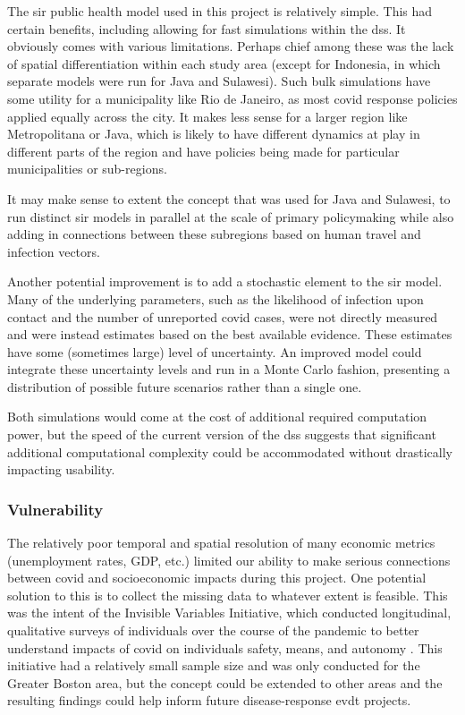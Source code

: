 The \ac{sir} public health model used in this project is relatively simple. This had certain benefits, including allowing for fast simulations within the \ac{dss}. It obviously comes with various limitations. Perhaps chief among these was the lack of spatial differentiation within each study area (except for Indonesia, in which separate models were run for Java and Sulawesi). Such bulk simulations have some utility for a municipality like Rio de Janeiro, as most \ac{covid} response policies applied equally across the city. It makes less sense for a larger region like Metropolitana or Java, which is likely to have different dynamics at play in different parts of the region and have policies being made for particular municipalities or sub-regions.

It may make sense to extent the concept that was used for Java and Sulawesi, to run distinct \ac{sir} models in parallel at the scale of primary policymaking while also adding in connections between these subregions based on human travel and infection vectors.

Another potential improvement is to add a stochastic element to the \ac{sir} model. Many of the underlying parameters, such as the likelihood of infection upon contact and the number of unreported \ac{covid} cases, were not directly measured and were instead estimates based on the best available evidence. These estimates have some (sometimes large) level of uncertainty. An improved model could integrate these uncertainty levels and run in a Monte Carlo fashion, presenting a distribution of possible future scenarios rather than a single one.

Both simulations would come at the cost of additional required computation power, but the speed of the current version of the \ac{dss} suggests that significant additional computational complexity could be accommodated without drastically impacting usability.

\subsubsection{Vulnerability}

The relatively poor temporal and spatial resolution of many economic metrics (unemployment rates, GDP, etc.) limited our ability to make serious connections between \ac{covid} and socioeconomic impacts during this project. One potential solution to this is to collect the missing data to whatever extent is feasible. This was the intent of the Invisible Variables Initiative, which conducted longitudinal, qualitative surveys of individuals over the course of the pandemic to better understand impacts of \ac{covid} on individuals safety, means, and autonomy \cite{turnerInvisibleVariablesImpact2021}. This initiative had a relatively small sample size and was only conducted for the Greater Boston area, but the concept could be extended to other areas and the resulting findings could help inform future disease-response \ac{evdt} projects.

